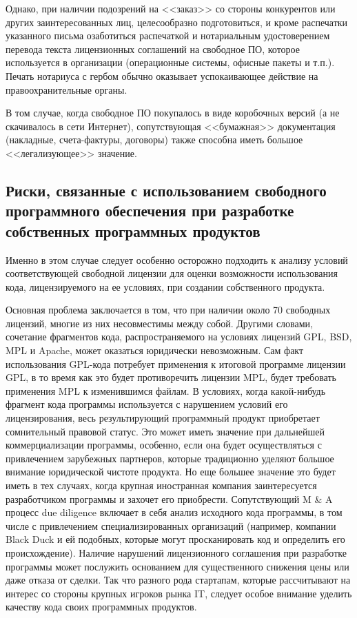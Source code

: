 \documentclass[10pt, a5paper]{article}
\begin{document}
Однако, при наличии подозрений на <<заказ>> со стороны конкурентов или других заинтересованных лиц, целесообразно подготовиться, и кроме распечатки указанного письма озаботиться распечаткой и нотариальным удостоверением перевода текста лицензионных соглашений на свободное ПО, которое используется в организации (операционные системы, офисные пакеты и т.п.). Печать нотариуса с гербом обычно оказывает успокаивающее действие на правоохранительные органы.

В том случае, когда свободное ПО покупалось в виде коробочных версий (а не скачивалось в сети Интернет), сопутствующая <<бумажная>> документация (накладные, счета-фактуры, договоры) также способна иметь большое <<легализующее>> значение.

\subsection*{Риски, связанные с использованием свободного программного обеспечения при разработке собственных программных продуктов}

Именно в этом случае следует особенно осторожно подходить к анализу условий соответствующей свободной лицензии для оценки возможности использования кода, лицензируемого на ее условиях, при создании собственного продукта.

Основная проблема заключается в том, что при наличии около 70 свободных лицензий, многие из них несовместимы между собой. Другими словами, сочетание фрагментов кода, распространяемого на условиях лицензий GPL, BSD, MPL и Apache, может оказаться юридически невозможным. Сам факт использования GPL-кода потребует применения к итоговой программе лицензии GPL, в то время как это будет противоречить лицензии MPL, будет требовать применения MPL к изменившимся файлам. В условиях, когда какой-нибудь фрагмент кода программы используется с нарушением условий его лицензирования, весь результирующий программный продукт приобретает сомнительный правовой статус. Это может иметь значение при дальнейшей коммерциализации программы, особенно, если она будет осуществляться с привлечением зарубежных партнеров, которые традиционно уделяют большое внимание юридической чистоте продукта. Но еще большее значение это будет иметь в тех случаях, когда крупная иностранная компания заинтересуется разработчиком программы и захочет его приобрести. Сопутствующий M \& A процесс due diligence включает в себя анализ исходного кода программы, в том числе с привлечением специализированных организаций (например, компании Black Duck и ей подобных, которые могут просканировать код и определить его происхождение). Наличие нарушений лицензионного соглашения при разработке программы может послужить основанием для существенного снижения цены или даже отказа от сделки. Так что разного рода стартапам, которые рассчитывают на интерес со стороны крупных игроков рынка IT, следует особое внимание уделить качеству кода своих программных продуктов.
\end{document}
